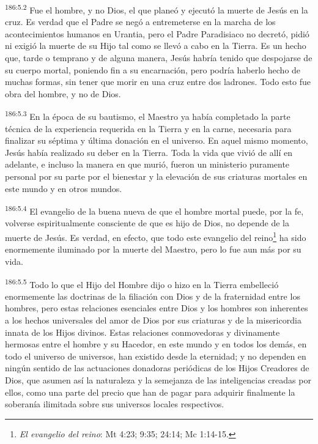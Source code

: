 \par 
\textsuperscript{186:5.2} Fue el hombre, y no Dios, el que planeó y ejecutó la muerte de Jesús en la cruz. Es verdad que el Padre se negó a entremeterse en la marcha de los acontecimientos humanos en Urantia, pero el Padre Paradisiaco no decretó, pidió ni exigió la muerte de su Hijo tal como se llevó a cabo en la Tierra. Es un hecho que, tarde o temprano y de alguna manera, Jesús habría tenido que despojarse de su cuerpo mortal, poniendo fin a su encarnación, pero podría haberlo hecho de muchas formas, sin tener que morir en una cruz entre dos ladrones. Todo esto fue obra del hombre, y no de Dios.

\par 
\textsuperscript{186:5.3} En la época de su bautismo, el Maestro ya había completado la parte técnica de la experiencia requerida en la Tierra y en la carne, necesaria para finalizar su séptima y última donación en el universo. En aquel mismo momento, Jesús había realizado su deber en la Tierra. Toda la vida que vivió de allí en adelante, e incluso la manera en que murió, fueron un ministerio puramente personal por su parte por el bienestar y la elevación de sus criaturas mortales en este mundo y en otros mundos.

\par 
\textsuperscript{186:5.4} El evangelio de la buena nueva de que el hombre mortal puede, por la fe, volverse espiritualmente consciente de que es hijo de Dios, no depende de la muerte de Jesús. Es verdad, en efecto, que todo este evangelio del reino\footnote{\textit{El evangelio del reino}: Mt 4:23; 9:35; 24:14; Mc 1:14-15.} ha sido enormemente iluminado por la muerte del Maestro, pero lo fue aun más por su vida.

\par 
\textsuperscript{186:5.5} Todo lo que el Hijo del Hombre dijo o hizo en la Tierra embelleció enormemente las doctrinas de la filiación con Dios y de la fraternidad entre los hombres, pero estas relaciones esenciales entre Dios y los hombres son inherentes a los hechos universales del amor de Dios por sus criaturas y de la misericordia innata de los Hijos divinos. Estas relaciones conmovedoras y divinamente hermosas entre el hombre y su Hacedor, en este mundo y en todos los demás, en todo el universo de universos, han existido desde la eternidad; y no dependen en ningún sentido de las actuaciones donadoras periódicas de los Hijos Creadores de Dios, que asumen así la naturaleza y la semejanza de las inteligencias creadas por ellos, como una parte del precio que han de pagar para adquirir finalmente la soberanía ilimitada sobre sus universos locales respectivos.

